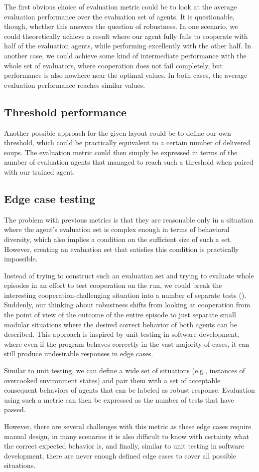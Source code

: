 The first obvious choice of evaluation metric could be to look at the average evaluation performance over the evaluation set of agents.
It is questionable, though, whether this answers the question of robustness.
In one scenario, we could theoretically achieve a result where our agent fully fails to cooperate with half of the evaluation agents, while performing excellently with the other half.
In another case, we could achieve some kind of intermediate performance with the whole set of evaluators, where cooperation does not fail completely, but performance is also nowhere near the optimal values.
In both cases, the average evaluation performance reaches similar values. 

\subsection{Threshold performance}

Another possible approach for the given layout could be to define our own threshold, which could be practically equivalent to a certain number of delivered soups.
The evaluation metric could then simply be expressed in terms of the number of evaluation agents that managed to reach such a threshold when paired with our trained agent.

\subsection{Edge case testing}
The problem with previous metrics is that they are reasonable only in a situation where the agent's evaluation set is complex enough in terms of behavioral diversity, which also implies a condition on the sufficient size of such a set. 
However, creating an evaluation set that satisfies this condition is practically impossible.

Instead of trying to construct such an evaluation set and trying to evaluate whole episodes in an effort to test cooperation on the run, we could break the interesting cooperation-challenging situation into a number of separate tests (\cite{knott2021evaluating}).
Suddenly, our thinking about robustness shifts from looking at cooperation from the point of view of the outcome of the entire episode to just separate small modular situations where the desired correct behavior of both agents can be described.
This approach is inspired by unit testing in software development, where even if the program behaves correctly in the vast majority of cases, it can still produce undesirable responses in edge cases.


Similar to unit testing, we can define a wide set of situations (e.g., instances of overcooked environment states) and pair them with a set of acceptable consequent behaviors of agents that can be labeled as robust response.
Evaluation using such a metric can then be expressed as the number of tests that have passed.

However, there are several challenges with this metric as these edge cases require manual design, in many scenarios it is also difficult to know with certainty what the correct expected behavior is, and finally, similar to unit testing in software development, there are never enough defined edge cases to cover all possible situations.